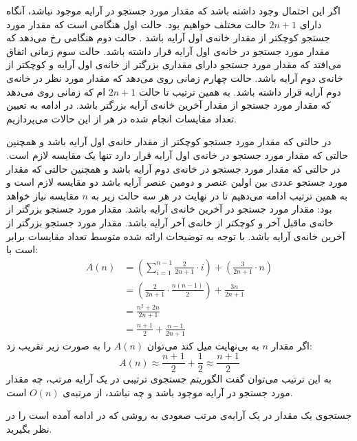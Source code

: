 {اگر این احتمال وجود داشته باشد که مقدار مورد جستجو در آرایه موجود نباشد، آنگاه دارای {$2n+1$} حالت مختلف خواهیم بود. حالت اول هنگامی ‌است که مقدار مورد جستجو کوچکتر از مقدار خانه‌ی اول آرایه باشد . حالت دوم هنگامی رخ می‌دهد که مقدار مورد جستجو در خانه‌ی اول آرایه قرار داشته باشد. حالت سوم زمانی اتفاق می‌افتد که مقدار مورد جستجو دارای مقداری بزرگتر از خانه‌ی اول آرایه و کوچکتر از خانه‌ی دوم آرایه باشد. حالت چهارم زمانی روی می‌دهد که مقدار مورد نظر در خانه‌ی دوم آرایه قرار داشته باشد. به همین ترتیب تا حالت {$2n+1$} ام که زمانی روی می‌دهد که مقدار مورد جستجو از مقدار آخرین خانه‌ی آرایه بزرگتر باشد. در ادامه به تعیین تعداد مقایسات انجام ‌شده در هر از این حالات می‌پردازیم.

در حالتی که مقدار مورد جستجو کوچکتر از مقدار خانه‌ی اول آرایه باشد و همچنین حالتی که مقدار مورد جستجو در خانه‌ی اول آرایه قرار دارد تنها یک مقایسه لازم است. در حالتی که مقدار مورد جستجو در خانه‌ی دوم آرایه باشد و همچنین حالتی که مقدار مورد جستجو عددی بین اولین عنصر و دومین عنصر آرایه باشد دو مقایسه لازم است و به همین ترتیب ادامه می‌دهیم تا در نهایت در هر سه حالت زیر به {$n$} مقایسه نیاز خواهد بود:
 مقدار مورد جستجو در آخرین خانه‌ی آرایه باشد.
 مقدار مورد جستجو بزرگتر از خانه‌ی ماقبل آخر و کوچکتر از خانه‌ی آخر آرایه باشد.
 مقدار مورد جستجو بزرگتر از آخرین خانه‌ی آرایه باشد.
با توجه به توضیحات ارائه شده متوسط تعداد مقایسات برابر است با:
\begin{align*}
A(n)&=\left( \sum_{i=1}^{n-1}{\frac{2}{2n+1} \cdot i} \right) + \left( \frac{3}{2n+1} \cdot n\right)\\
	&=\left({\frac{2}{2n+1}\cdot\frac{n(n-1)}{2}}\right)+\frac{3n}{2n+1}\\
	&=\frac{n^2+2n}{2n+1}\\
	&=\frac{n+1}{2}+\frac{n-1}{2n+1}
\end{align*}
اگر مقدار {$n$} به بی‌نهایت میل کند می‌توان {$A(n)$} را به صورت زیر تقریب زد:
\begin{displaymath}
A(n)\approx\frac{n+1}{2} + \frac{1}{2}\approx\frac{n+1}{2}
\end{displaymath}
به این ترتیب می‌توان گفت الگوریتم جستجوی ترتیبی در یک آرایه مرتب، چه مقدار مورد جستجو در آرایه موجود باشد و چه نباشد، از مرتبه‌ی {$O(n)$} است.

 جستجوی یک مقدار در یک آرایه‌ی مرتب صعودی به روشی که در ادامه آمده است را در نظر بگیرید. 

}
